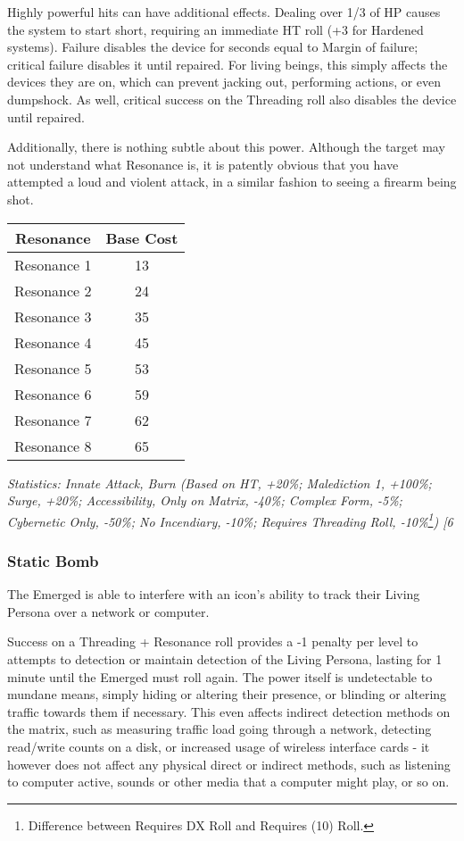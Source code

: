 \begin{multicols*}{3}
	Highly powerful hits can have additional effects. Dealing over 1/3 of HP causes the system to start short, requiring an immediate HT roll (+3 for Hardened systems). Failure disables the device for seconds equal to Margin of failure; critical failure disables it until repaired. For living beings, this simply affects the devices they are on, which can prevent jacking out, performing actions, or even dumpshock. As well, critical success on the Threading roll also disables the device until repaired.
	
	Additionally, there is nothing subtle about this power. Although the target may not understand what Resonance is, it is patently obvious that you have attempted a loud and violent attack, in a similar fashion to seeing a firearm being shot.
	
	\begin{center}
		\begin{tabular}{|c|c|}
			\hline
			Resonance & Base Cost\\
			\hline
			\hline
			Resonance 1 & 13 \\
			Resonance 2 & 24 \\
			Resonance 3 & 35 \\
			Resonance 4 & 45 \\
			Resonance 5 & 53 \\
			Resonance 6 & 59 \\
			Resonance 7 & 62 \\
			Resonance 8 & 65 \\
			\hline
		\end{tabular}
	\end{center}
	
	\textcolor{OliveGreen}{\textit{Statistics: Innate Attack, Burn (Based on HT, +20\%; Malediction 1, +100\%; Surge, +20\%; Accessibility, Only on Matrix, -40\%; Complex Form, -5\%; Cybernetic Only, -50\%; No Incendiary, -10\%; Requires Threading Roll, -10\%\footnote{Difference between Requires DX Roll and Requires (10) Roll.}) [6}}
	
	\subsubsection*{Static Bomb}\label{static_bomb}
	
	The Emerged is able to interfere with an icon's ability to track their Living Persona over a network or computer.
	
	Success on a Threading + Resonance roll provides a -1 penalty per level to attempts to detection or maintain detection of the Living Persona, lasting for 1 minute until the Emerged must roll again. The power itself is undetectable to mundane means, simply hiding or altering their presence, or blinding or altering traffic towards them if necessary. This even affects indirect detection methods on the matrix, such as measuring traffic load going through a network, detecting read/write counts on a disk, or increased usage of wireless interface cards - it however does not affect any physical direct or indirect methods, such as listening to computer active, sounds or other media that a computer might play, or so on.
	

\end{multicols*}

